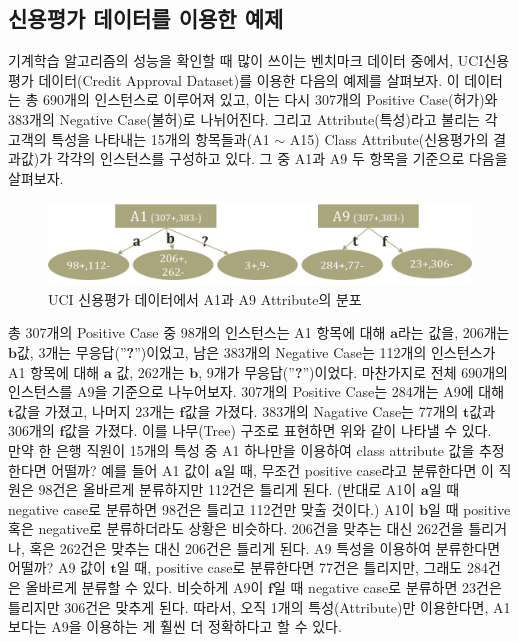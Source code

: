 \documentclass[a4paper]{oblivoir}
\begin{document}
\subsection{신용평가 데이터를 이용한 예제}
기계학습 알고리즘의 성능을 확인할 때 많이 쓰이는 벤치마크 데이터 중에서, UCI신용평가 데이터(Credit Approval Dataset)를 이용한 다음의 예제를 살펴보자. 이 데이터는 총 690개의 인스턴스로 이루어져 있고, 이는 다시 307개의 Positive Case(허가)와 383개의 Negative Case(불허)로 나뉘어진다. 그리고 Attribute(특성)라고 불리는 각 고객의 특성을 나타내는 15개의 항목들과(A1 $\sim$ A15) Class Attribute(신용평가의 결과값)가 각각의 인스턴스를 구성하고 있다. 그 중 A1과 A9 두 항목을 기준으로 다음을 살펴보자. \\
\begin{figure}[ht]
\centering
\includegraphics[scale=0.6]{Decision_Tree3.png}
\caption{UCI 신용평가 데이터에서 A1과 A9 Attribute의 분포}
\label{Figure 2-13}
\end{figure}
\indent 총 307개의 Positive Case 중 98개의 인스턴스는 A1 항목에 대해 $\textbf{a}$라는 값을, 206개는 $\textbf{b}$값, 3개는 무응답(''\textbf{?}'')이었고, 남은 383개의 Negative Case는 112개의 인스턴스가 A1 항목에 대해 $\textbf{a}$ 값, 262개는 $\textbf{b}$, 9개가 무응답(''\textbf{?}'')이었다. 마찬가지로 전체 690개의 인스턴스를 A9을 기준으로 나누어보자. 307개의 Positive Case는 284개는 A9에 대해 $\textbf{t}$값을 가졌고, 나머지 23개는 $\textbf{f}$값을 가졌다. 383개의 Nagative Case는 77개의 $\textbf{t}$값과 306개의 $\textbf{f}$값을 가졌다. 이를 나무(Tree) 구조로 표현하면 위와 같이 나타낼 수 있다. \\
\indent 만약 한 은행 직원이 15개의 특성 중 A1 하나만을 이용하여 class attribute 값을 추정한다면 어떨까? 예를 들어 A1 값이 $\textbf{a}$일 때, 무조건 positive case라고 분류한다면 이 직원은 98건은 올바르게 분류하지만 112건은 틀리게 된다. (반대로 A1이 $\textbf{a}$일 때 negative case로 분류하면 98건은 틀리고 112건만 맞출 것이다.) A1이 $\textbf{b}$일 때 positive 혹은 negative로 분류하더라도 상황은 비슷하다. 206건을 맞추는 대신 262건을 틀리거나, 혹은 262건은 맞추는 대신 206건은 틀리게 된다. A9 특성을 이용하여 분류한다면 어떨까? A9 값이 $\textbf{t}$일 때, positive case로 분류한다면 77건은 틀리지만, 그래도 284건은 올바르게 분류할 수 있다. 비슷하게 A9이 $\textbf{f}$일 때 negative case로 분류하면 23건은 틀리지만 306건은 맞추게 된다. 따라서, 오직 1개의 특성(Attribute)만 이용한다면, A1보다는 A9을 이용하는 게 훨씬 더 정확하다고 할 수 있다. \\
\end{document}
